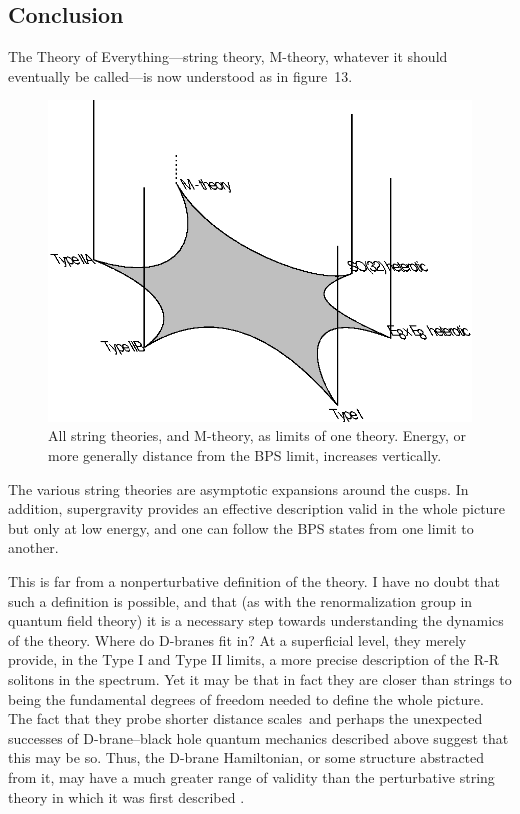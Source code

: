 \documentclass[12pt]{article}
\begin{document}
\subsection{Conclusion}

The Theory of Everything---string theory, M-theory, whatever it should
eventually be called---is now understood as in figure~13.
\begin{figure}
\begin{center}
\leavevmode
\includegraphics{tilt.eps}
\end{center}
\caption[]{All string theories, and M-theory, as limits of one theory. 
Energy, or more generally  distance from the BPS limit, increases vertically.}
\end{figure}
The various string theories are asymptotic expansions around the 
cusps.  In addition, supergravity provides an effective description valid in
the whole picture but only at low energy, and one can follow the
BPS states from one limit to another.

This is far from a nonperturbative definition of the theory.  I have no doubt
that such a definition is possible, and that (as with the renormalization
group in quantum field theory) it is a necessary step towards understanding
the dynamics of the theory. Where do D-branes fit in?  At a superficial
level, they merely provide, in the Type I and Type II limits, a more precise
description of the R-R solitons in the spectrum.  Yet it may be that in fact
they are closer than strings to being the fundamental degrees of freedom
needed to define the whole picture.  The fact that they probe shorter
distance scales\, \cite{short} and perhaps the unexpected successes of 
D-brane--black hole quantum mechanics described above suggest that this may
be so.  Thus, the D-brane Hamiltonian, or some structure abstracted from
it, may have a much greater range of validity than the perturbative
string theory in which it was first described \cite{bfss}.
\end{document}

